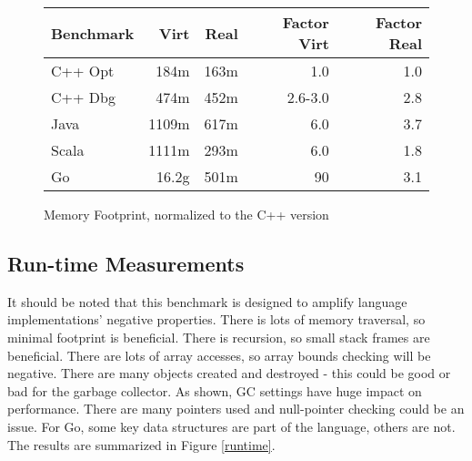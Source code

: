 \begin{figure}
\begin{tabular}{|l|r|r|r|r|} \hline
 Benchmark	& Virt &Real &   Factor Virt  & Factor Real \\ \hline\hline
 C++ Opt	& 184m &163m & 	 1.0	      & 1.0 \\ \hline
 C++ Dbg	& 474m &452m & 	 2.6-3.0      & 2.8 \\ \hline
 Java	        &1109m &617m & 	 6.0	      & 3.7 \\ \hline
 Scala          &1111m &293m &   6.0	      & 1.8 \\ \hline
 Go	        &16.2g &501m & 	 90	      & 3.1 \\ \hline
\end{tabular}
\caption{Memory Footprint, normalized to the C++ version}
\label{codesize}
\end{figure}

\subsection{Run-time Measurements}

It should be noted that this benchmark is designed to amplify language
implementations' negative properties. There is lots of memory
traversal, so minimal footprint is beneficial. There is recursion, so
small stack frames are beneficial. There are lots of array accesses,
so array bounds checking will be negative. There are many objects
created and destroyed - this could be good or bad for the garbage
collector. As shown, GC settings have huge impact on
performance. There are many pointers used and null-pointer checking
could be an issue. For Go, some key data structures are part of the
language, others are not. The results are summarized in Figure \ref{runtime}.

